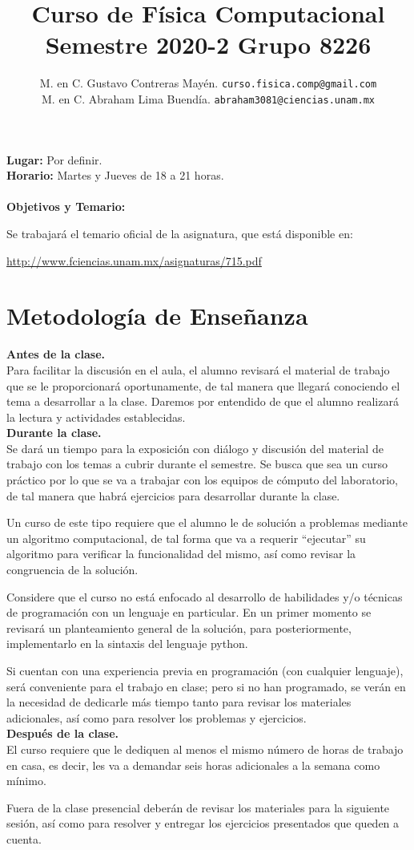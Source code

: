 \documentclass[12pt]{article}
\author{M. en C. Gustavo Contreras Mayén. \texttt{curso.fisica.comp@gmail.com}\\
M. en C. Abraham Lima Buendía. \texttt{abraham3081@ciencias.unam.mx}}
\title{Curso de Física Computacional\\{\large Semestre 2020-2 Grupo 8226}}
\date{ }
\begin{document}
\renewcommand\labelenumii{\theenumi.{\arabic{enumii}}}
\maketitle
\fontsize{12}{12}\selectfont
\textbf{Lugar: } Por definir.
\\
\textbf{Horario: } Martes y Jueves de 18 a 21 horas.
\\
\\
\textbf{Objetivos y Temario:}
\par
Se trabajará el temario oficial de la asignatura, que está disponible en:

\href{http://www.fciencias.unam.mx/asignaturas/715.pdf}{http://www.fciencias.unam.mx/asignaturas/715.pdf}
\section{Metodología de Enseñanza}
\textbf{Antes de la clase.}
\\
Para facilitar la discusión en el aula, el alumno revisará el material de trabajo que se le proporcionará oportunamente, de tal manera que llegará conociendo el tema a desarrollar a la clase. Daremos por entendido de que el alumno realizará la lectura y actividades establecidas.
\\
\textbf{Durante la clase.}
\\
Se dará un tiempo para la exposición con diálogo y discusión del material de trabajo con los temas a cubrir durante el semestre. Se busca que sea un curso práctico por lo que se va a trabajar con los equipos de cómputo del laboratorio, de tal manera que habrá ejercicios para desarrollar durante la clase.
\par
Un curso de este tipo requiere que el alumno le de solución a problemas mediante un algoritmo computacional, de tal forma que va a requerir \enquote{ejecutar} su algoritmo para verificar la funcionalidad del mismo, así como revisar la congruencia de la solución.
\par
Considere que el curso no está enfocado al desarrollo de habilidades y/o técnicas de programación con un lenguaje en particular. En un primer momento se revisará un planteamiento general de la solución, para posteriormente, implementarlo en la sintaxis del lenguaje python.
\par
Si cuentan con una experiencia previa en programación (con cualquier lenguaje), será conveniente para el trabajo en clase; pero si no han programado, se verán en la necesidad de dedicarle más tiempo tanto para revisar los materiales adicionales, así como para resolver los problemas y ejercicios.
\\
\textbf{Después de la clase.}
\\
El curso requiere que le dediquen al menos el mismo número de horas de trabajo en casa, es decir, les va a demandar seis horas adicionales a la semana como mínimo.
\par
Fuera de la clase presencial deberán de revisar los materiales para la siguiente sesión, así como para resolver y entregar los ejercicios presentados que queden a cuenta.
\end{document}
